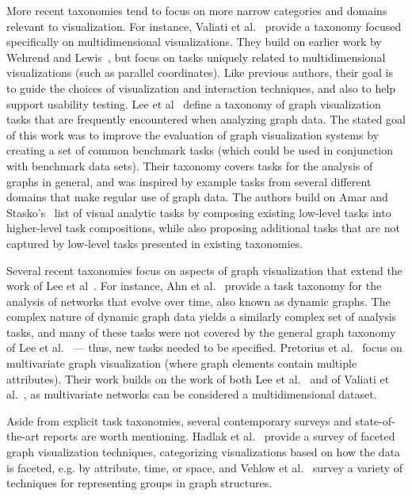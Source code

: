\documentclass[twocolumn]{bmcart}%
\begin{document}
More recent taxonomies tend to focus on more narrow categories and domains relevant to visualization.
For instance, Valiati et al.~\cite{Valiati2006} provide a taxonomy focused specifically on multidimensional visualizations.
They build on earlier work by Wehrend and Lewis~\cite{Wehrend1990}, but focus on tasks uniquely related to multidimensional visualizations (such as parallel coordinates).
Like previous authors, their goal is to guide the choices of visualization and interaction techniques, and also to help support usability testing.
Lee et al~\cite{Lee2006} define a taxonomy of graph visualization tasks that are frequently encountered when analyzing graph data.
The stated goal of this work was to improve the evaluation of graph visualization systems by creating a set of common benchmark tasks (which could be used in conjunction with benchmark data sets).
Their taxonomy covers tasks for the analysis of graphs in general, and was inspired by example tasks from several different domains that make regular use of graph data.
The authors build on Amar and Stasko's~\cite{Amar2005} list of visual analytic tasks by composing existing low-level tasks into higher-level task compositions, while also proposing additional tasks that are not captured by low-level tasks presented in existing taxonomies.

Several recent taxonomies focus on aspects of graph visualization that extend the work of Lee et al~\cite{Lee2006}.
For instance, Ahn et al.~\cite{Ahn2014} provide a task taxonomy for the analysis of networks that evolve over time, also known as dynamic graphs.
The complex nature of dynamic graph data yields a similarly complex set of analysis tasks, and many of these tasks were not covered by the general graph taxonomy of Lee et al.~\cite{Lee2006} --- thus, new tasks needed to be specified.
Pretorius et al.~\cite{Pretorius2014} focus on multivariate graph visualization (where graph elements contain multiple attributes).
Their work builds on the work of both Lee et al.~\cite{Lee2006} and of Valiati et al.~\cite{Valiati2006}, as multivariate networks can be considered a multidimensional dataset.

Aside from explicit task taxonomies, several contemporary surveys and state-of-the-art reports are worth mentioning.
Hadlak et al.~\cite{hadlak2015survey} provide a survey of faceted graph visualization techniques, categorizing visualizations based on how the data is faceted, e.g. by attribute, time, or space, and Vehlow et al.~\cite{vehlow2015state} survey a variety of techniques for representing groups in graph structures.
\end{document}

